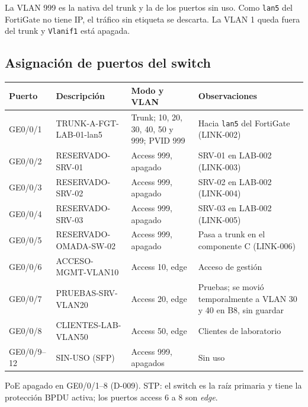 \documentclass[11pt,a4paper]{article}
\newcommand{\cab}{\rowcolor{light}}
\begin{document}
La VLAN 999 es la nativa del trunk y la de los puertos sin uso. Como \texttt{lan5} del FortiGate no tiene IP, el tráfico sin etiqueta se descarta. La VLAN 1 queda fuera del trunk y \texttt{Vlanif1} está apagada.

\subsection{Asignación de puertos del switch}
{\small
\begin{longtable}{L{2.2cm} L{4.4cm} L{3.8cm} L{4.3cm}}
  \toprule
  \cab\textbf{Puerto} & \textbf{Descripción} & \textbf{Modo y VLAN} & \textbf{Observaciones}\\
  \midrule
  \endhead
  GE0/0/1 & TRUNK-A-FGT-LAB-01-lan5 & Trunk; 10, 20, 30, 40, 50 y 999; PVID 999 & Hacia \texttt{lan5} del FortiGate (LINK-002)\\
  GE0/0/2 & RESERVADO-SRV-01 & Access 999, apagado & SRV-01 en LAB-002 (LINK-003)\\
  GE0/0/3 & RESERVADO-SRV-02 & Access 999, apagado & SRV-02 en LAB-002 (LINK-004)\\
  GE0/0/4 & RESERVADO-SRV-03 & Access 999, apagado & SRV-03 en LAB-002 (LINK-005)\\
  GE0/0/5 & RESERVADO-OMADA-SW-02 & Access 999, apagado & Pasa a trunk en el componente C (LINK-006)\\
  GE0/0/6 & ACCESO-MGMT-VLAN10 & Access 10, edge & Acceso de gestión\\
  GE0/0/7 & PRUEBAS-SRV-VLAN20 & Access 20, edge & Pruebas; se movió temporalmente a VLAN 30 y 40 en B8, sin guardar\\
  GE0/0/8 & CLIENTES-LAB-VLAN50 & Access 50, edge & Clientes de laboratorio\\
  GE0/0/9--12 & SIN-USO (SFP) & Access 999, apagados & Sin uso\\
  \bottomrule
\end{longtable}
}

PoE apagado en GE0/0/1--8 (D-009). STP: el switch es la raíz primaria y tiene la protección BPDU activa; los puertos access 6 a 8 son \emph{edge}.

\newpage
\end{document}
